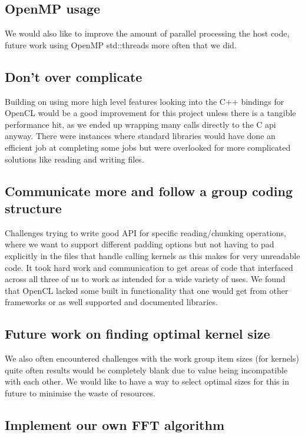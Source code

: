 \documentclass{article}
\begin{document}
\subsection{OpenMP usage}

We would also like to improve the amount of parallel processing the host code, future work using OpenMP std::threads more often that we did.

\subsection{Don't over complicate}

Building on using more high level features looking into the C++ bindings for OpenCL would be a good improvement for this project unless there is a tangible performance hit, as we ended up wrapping many calls directly to the C api anyway. There were instances where standard libraries would have done an efficient job at completing some jobs but were overlooked for more complicated solutions like reading and writing files.

\subsection{Communicate more and follow a group coding structure}

Challenges trying to write good API for specific reading/chunking operations, where we want to support different padding options but not having to pad explicitly in the files that handle calling kernels as this makes for very unreadable code. It took hard work and communication to get areas of code that interfaced across all three of us to work as intended for a wide variety of uses. We found that OpenCL lacked some built in functionality that one would get from other frameworks or as well supported and documented libraries.

\subsection{Future work on finding optimal kernel size}

We also often encountered challenges with the work group item sizes (for kernels) quite often results would be completely blank due to value being incompatible with each other. We would like to have a way to select optimal sizes for this in future to minimise the waste of resources.

\subsection{Implement our own FFT algorithm}
\end{document}
